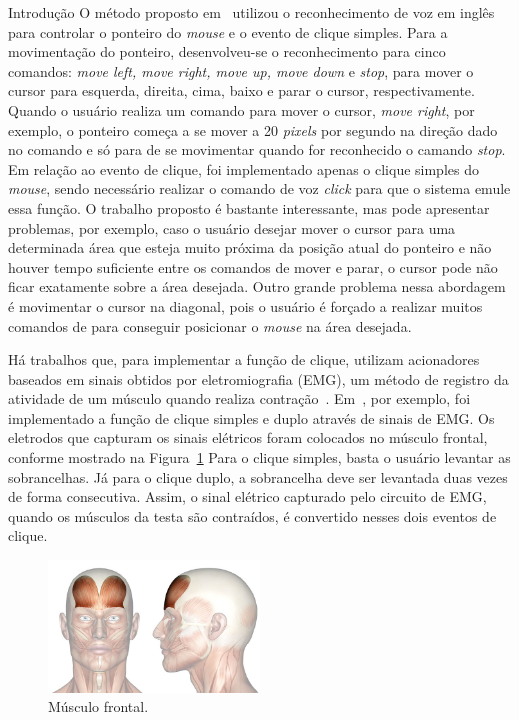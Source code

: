 \begin{chapter}{Introdução}
O método proposto em~\cite{Karimullah02} utilizou o reconhecimento de voz em
inglês para controlar o ponteiro do \textit{mouse} e o evento de clique simples.
Para a movimentação do ponteiro, desenvolveu-se o reconhecimento para cinco
comandos: \textit{move left, move right, move up, move down} e \textit{stop},
para mover o cursor para esquerda, direita, cima, baixo e parar o cursor,
respectivamente. Quando o usuário realiza um comando para mover o cursor,
\textit{move right}, por exemplo, o ponteiro começa a se mover a 20
\textit{pixels} por segundo na direção dado no comando e só para de se
movimentar quando for reconhecido o camando \textit{stop}. Em relação ao evento
de clique, foi implementado apenas o clique simples do \textit{mouse}, sendo
necessário realizar o comando de voz \textit{click} para que o sistema emule
essa função. O trabalho proposto é bastante interessante, mas pode apresentar
problemas, por exemplo, caso o usuário desejar mover o cursor para uma
determinada área que esteja muito próxima da posição atual do ponteiro e não
houver tempo suficiente entre os comandos de mover e parar, o cursor pode não
ficar exatamente sobre a área desejada. Outro grande problema nessa abordagem é
movimentar o cursor na diagonal, pois o usuário é forçado a realizar muitos
comandos de para conseguir posicionar o \textit{mouse} na área desejada.   

Há trabalhos que, para implementar a função de clique, utilizam acionadores
baseados em sinais obtidos por eletromiografia (EMG), um método de registro da
atividade de um músculo quando realiza contração~\cite{Amadio07}.
Em~\cite{Pinheiro12}, por exemplo, foi implementado a função de clique simples e
duplo através de sinais de EMG. Os eletrodos que capturam os sinais elétricos
foram colocados no músculo frontal, conforme mostrado na
Figura~\ref{fig:frontal} Para o clique simples, basta o usuário levantar as
sobrancelhas. Já para o clique duplo, a sobrancelha deve ser levantada duas
vezes de forma consecutiva. Assim, o sinal elétrico capturado pelo circuito de
EMG, quando os músculos da testa são contraídos, é convertido nesses dois
eventos de clique.
  
\begin{figure}[!h]
	\centering
	\includegraphics[width=0.5\textwidth]{fig/frontal}
	\caption{Músculo frontal.}
	\label{fig:frontal}
\end{figure}


\end{chapter}

